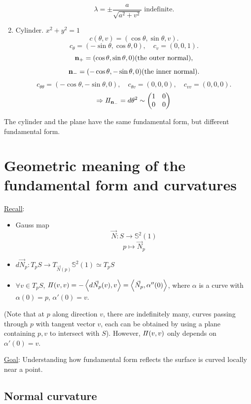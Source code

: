 \begin{example}
\begin{enumerate}[(1)]
\[        \lambda=\pm \frac{a}{\sqrt{a^2+v^2}}\text{ indefinite}.
    \]
    \item Cylinder. \(x^2+y^2=1\)
    \[
        c(\theta,v)=(\cos \theta,\sin\theta,v).    
    \]
    \[
        c_\theta=(-\sin \theta,\cos \theta,0),\quad
        c_v=(0,0,1).    
    \]
    \[
        \vb{n}_+=(\cos\theta,\sin\theta,0)(\text{the outer normal}),    
    \]
    \[
        \vb{n}_-=(-\cos\theta,-\sin\theta,0)(\text{the inner normal}).
    \]
    \[
        c_{\theta\theta}=(-\cos \theta,-\sin\theta,0),\quad
        c_{\theta v}=(0,0,0),\quad
        c_{vv}=(0,0,0).    
    \]
    \[\Rightarrow I\!I_{\vb{n}_-}=d \theta^2\sim \begin{pmatrix}
        1&0\\0&0
    \end{pmatrix}\]
    \end{enumerate}  
\end{example}
\begin{remark}
    The cylinder and the plane have the same  fundamental
    form, but different  fundamental form.
\end{remark}
\section{Geometric meaning of the \texorpdfstring{}{2nd} fundamental form and curvatures}
\underline{Recall}: \begin{itemize}
    \item Gauss map \[\vec{N}\colon S\to \mathbb{S}^2(1)\]
    \[p\mapsto \vec{N}_p\]
    \item \(d \vec{N}_p\colon T_p S\to T_{\vec{N}(p)}\mathbb{S}^2(1)
    \simeq T_pS\)
    \item \(\forall v \in T_p S\), \(I\!I(v,v)=-\left\langle d 
    \vec{N}_p(v),v
    \right\rangle=\left\langle \vec{N}_p,
    \alpha''(0)\right\rangle\), where
    \(\alpha\) is a curve with \(\alpha(0)=p\), \(\alpha'(0)=v\).
\end{itemize}
(Note that at \(p\) along direction \(v\), there are indefinitely
many, curves passing through \(p\) with tangent vector \(v\), each
can be obtained by using a plane containing \(p,v\) to intersect with
\(S\)). However, \(I\!I(v,v)\) only depends on \(\alpha'(0)=v\).

\underline{Goal}: Understanding how  fundamental 
form reflects the surface is curved locally near a point.
\subsection{Normal curvature}
    
